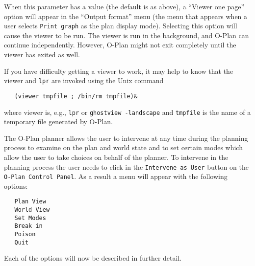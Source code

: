 When this parameter has a value (the default is as above), a ``Viewer
one page'' option will appear in the ``Output format'' menu (the menu
that appears when a user selects {\tt Print graph} as the plan display
mode).  Selecting this option will cause the viewer to be run.  The
viewer is run in the background, and O-Plan can continue
independently.  However, O-Plan might not exit completely until the
viewer has exited as well.

If you have difficulty getting a viewer to work, it may help to know
that the viewer and {\tt lpr} are invoked using the Unix command

\begin{verbatim} 
   (viewer tmpfile ; /bin/rm tmpfile)&
\end{verbatim}

where viewer is, e.g., {\tt lpr} or {\tt ghostview -landscape} and
{\tt tmpfile} is the name of a temporary file generated by O-Plan.

The O-Plan planner allows the user to intervene at any time during the
planning process to examine on the plan and world state and to set
certain modes which allow the user to take choices on behalf of the
planner. To intervene in the planning process the user needs to click
in the {\tt Intervene as User} button on the {\tt O-Plan Control
Panel}. As a result a menu will appear with the following options:

\begin{verbatim}
   Plan View
   World View
   Set Modes
   Break in
   Poison
   Quit
\end{verbatim}

Each of the options will now be described in further detail.


